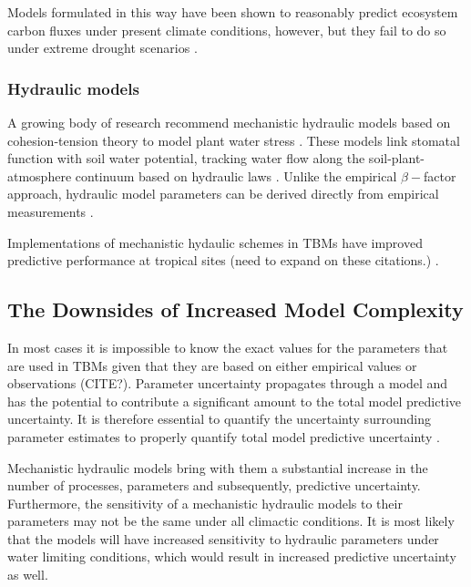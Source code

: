 \documentclass[10pt]{article}
\begin{document}
Models formulated in this way have been shown to reasonably predict ecosystem carbon fluxes under present climate conditions, however, but they fail to do so under extreme drought scenarios \citep{powell_2013, zhang_2015, paschalis_2020}.

\subsubsection*{Hydraulic models}

A growing body of research recommend mechanistic hydraulic models based on cohesion-tension theory to model plant water stress \citep{rogers_2017,fisher_2018}. These models link stomatal function with soil water potential, tracking water flow along the soil-plant-atmosphere continuum based on hydraulic laws \citep{sperry_2015, williams_1996}. Unlike the empirical $\beta-$factor approach, hydraulic model parameters can be derived directly from empirical measurements \citep{choat_2018}.

Implementations of mechanistic hydaulic schemes in TBMs have improved predictive performance at tropical sites (need to expand on these citations.) 
\citep{xu_2016, powell_2018, longo_2019, fisher_2007, fauset_2019, choat_2018}.

\subsection*{The Downsides of Increased Model Complexity}

In most cases it is impossible to know the exact values for the  parameters that are used in TBMs given that they are based on either empirical values or observations (CITE?). Parameter uncertainty propagates through a model and has the potential to contribute a significant amount to the total model predictive uncertainty. It is therefore essential to quantify the uncertainty surrounding parameter estimates to properly quantify total model predictive uncertainty \citep{dietze_2017, dietze_2017a}.

Mechanistic hydraulic models bring with them a substantial increase in the number of processes, parameters and subsequently, predictive uncertainty. Furthermore, the sensitivity of a mechanistic hydraulic models to their parameters may not be the same under all climactic conditions. It is most likely that the models will have increased sensitivity to hydraulic parameters under water limiting conditions, which would result in increased predictive uncertainty as well.
\end{document}
